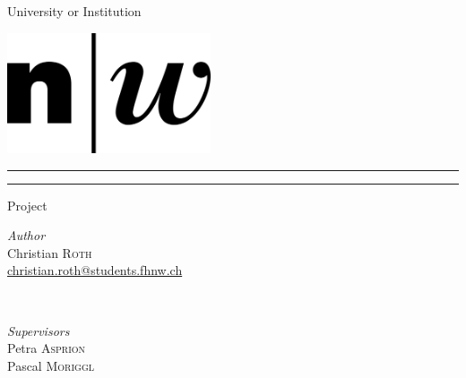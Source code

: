 \begin{titlepage}

\centering

\LARGE{University or Institution}


\vspace*{2cm}


\includegraphics[width=6cm]{figures/logo.png}

\vspace*{2cm}



\rule{\linewidth}{0.1mm}\vspace*{0.5\baselineskip}

\LARGE{\@title}

\rule{\linewidth}{0.1mm}\vspace*{0.5\baselineskip}



\vspace{3cm}
\LARGE{Project\\\@date}
\vspace{5cm}



\begin{minipage}{0.4\textwidth}
    \begin{flushleft}
        \large
        \textit{Author}\\Christian \textsc{Roth}\\
        {\href{mailto:christian.roth@students.fhnw.ch}
        {christian.roth@students.fhnw.ch}}
    \end{flushleft}
\end{minipage}
~
\begin{minipage}{0.4\textwidth}
    \begin{flushright}
        \large
        \textit{Supervisors}\\Petra \textsc{Asprion}\\Pascal \textsc{Moriggl}
    \end{flushright}
\end{minipage}

\end{titlepage}

